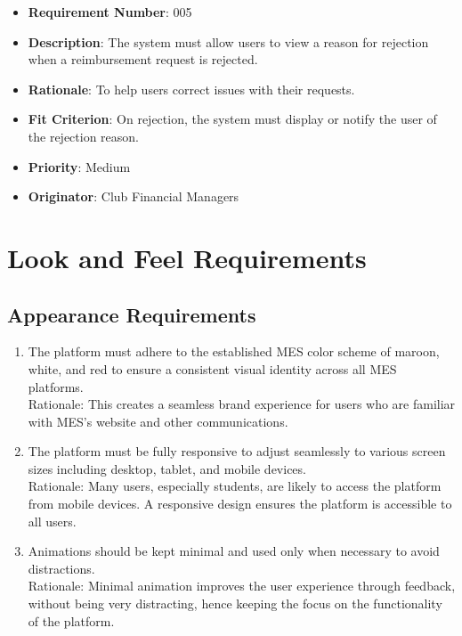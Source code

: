 \documentclass[12pt]{article}
\begin{document}
\begin{itemize}
  \bigskip
  
  \item \textbf{Requirement Number}: 005
  \item \textbf{Description}: The system must allow users to view a reason for rejection when a reimbursement request is rejected.
  \item \textbf{Rationale}: To help users correct issues with their requests.
  \item \textbf{Fit Criterion}: On rejection, the system must display or notify the user of the rejection reason.
  \item \textbf{Priority}: Medium
  \item \textbf{Originator}: Club Financial Managers

\end{itemize}

\section{Look and Feel Requirements}
\subsection{Appearance Requirements}
\begin{enumerate}
  \item The platform must adhere to the established MES color scheme of maroon, white, and red to ensure a consistent visual identity across all MES platforms. \\
  Rationale: This creates a seamless brand experience for users who are familiar with MES's website and other communications.
  \item The platform must be fully responsive to adjust seamlessly to various screen sizes including desktop, tablet, and mobile devices. \\
  Rationale: Many users, especially students, are likely to access the platform from mobile devices. A responsive design ensures the platform is accessible to all users.
  \item  Animations should be kept minimal and used only when necessary to avoid distractions. \\
  Rationale: Minimal animation improves the user experience through feedback, without being very distracting, hence keeping the focus on the functionality of the platform.
\end{enumerate}
\end{document}
